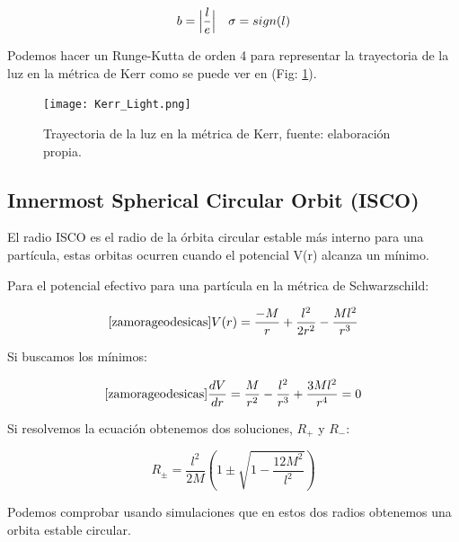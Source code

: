 \documentclass{article}
\DeclarePairedDelimiter\abs{\lvert}{\rvert}
\begin{document}
\begin{align}
  b= \abs[\Big]{\frac{l}{e}}  && \sigma=sign(l)
\end{align}

Podemos hacer un Runge-Kutta de orden 4 para representar la trayectoria de la luz en la métrica de Kerr como se puede ver en (Fig: \ref{fig:Kerr_Light}).

\begin{figure}[H]
    \centering
    \texttt{[image: Kerr\_Light.png]}
    \caption{Trayectoria de la luz en la métrica de Kerr, fuente: elaboración propia.}
    \label{fig:Kerr_Light}
\end{figure}

\subsection{Innermost Spherical Circular Orbit (ISCO)}
El radio ISCO es el radio de la órbita circular estable más interno para una partícula,\cite{levin2008periodic} estas orbitas ocurren cuando el potencial V(r) alcanza un mínimo.\cite{misner1973gravitation}

Para el potencial efectivo para una partícula en la métrica de Schwarzschild:

\begin{equation}\cite{zamorageodesicas}
    V(r)=\frac{-M}{r}+\frac{l^{2}}{2r^{2}}-\frac{Ml^{2}}{r^{3}}
\end{equation}

Si buscamos los mínimos:

\begin{equation}\cite{zamorageodesicas}
    \frac{dV}{dr}=\frac{M}{r^{2}}-\frac{l^{2}}{r^{3}}+\frac{3Ml^{2}}{r^{4}}=0
\end{equation}

Si resolvemos la ecuación obtenemos dos soluciones, $R_{+}$ y $R_{-}$:

\begin{equation}
    R_{\pm}=\frac{l^{2}}{2M}\left(1\pm \sqrt{1-\frac{12M^{2}}{l^{2}}}\right)
\end{equation}

Podemos comprobar usando simulaciones que en estos dos radios obtenemos una orbita estable circular.
\end{document}
